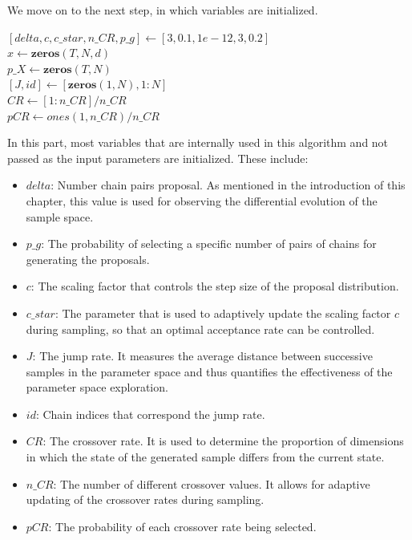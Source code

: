 We move on to the next step, in which variables are initialized.\\

\begin{algorithm}[H]
$[delta, c, c\_star, n\_CR, p\_g] \gets [3, 0.1, 1e-12, 3, 0.2]$\\
$x \gets \textbf{zeros}(T, N, d)$\\
$p\_X \gets \textbf{zeros}(T, N)$\\
$[J, id] \gets [\textbf{zeros}(1, N), 1:N]$\\
$CR \gets [1:n\_CR] / n\_CR$\\
$pCR \gets ones(1, n\_CR) / n\_CR$\\
\end{algorithm}

In this part, most variables that are internally used in this algorithm and not passed as the input parameters are initialized. These include:
\begin{itemize}
    \item $delta$: Number chain pairs proposal. As mentioned in the introduction of this chapter, this value is used for observing the differential evolution of the sample space.
    \item $p\_g$: The probability of selecting a specific number of pairs of chains for generating the proposals.
    \item $c$: The scaling factor that controls the step size of the proposal distribution.
    \item $c\_star$: The parameter that is used to adaptively update the scaling factor $c$ during sampling, so that an optimal acceptance rate can be controlled.
    \item $J$: The jump rate. It measures the average distance between successive samples in the parameter space and thus quantifies the effectiveness of the parameter space exploration.
    \item $id$: Chain indices that correspond the jump rate.
    \item $CR$: The crossover rate. It is used to determine the proportion of dimensions in which the state of the generated sample differs from the current state.
    \item $n\_CR$: The number of different crossover values. It allows for adaptive updating of the crossover rates during sampling.
    \item $pCR$: The probability of each crossover rate being selected.
\end{itemize}

